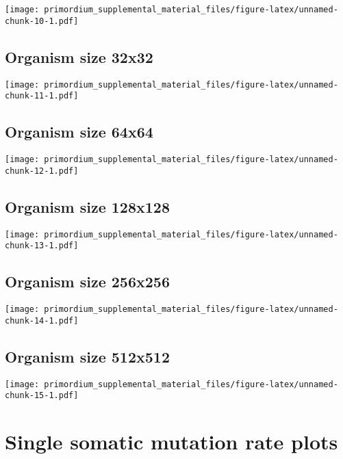 \documentclass[]{book}
\begin{document}
\texttt{[image: primordium\_supplemental\_material\_files/figure-latex/unnamed-chunk-10-1.pdf]}

\hypertarget{organism-size-32x32}{%
\subsection{Organism size 32x32}\label{organism-size-32x32}}

\texttt{[image: primordium\_supplemental\_material\_files/figure-latex/unnamed-chunk-11-1.pdf]}

\hypertarget{organism-size-64x64}{%
\subsection{Organism size 64x64}\label{organism-size-64x64}}

\texttt{[image: primordium\_supplemental\_material\_files/figure-latex/unnamed-chunk-12-1.pdf]}

\hypertarget{organism-size-128x128}{%
\subsection{Organism size 128x128}\label{organism-size-128x128}}

\texttt{[image: primordium\_supplemental\_material\_files/figure-latex/unnamed-chunk-13-1.pdf]}

\hypertarget{organism-size-256x256}{%
\subsection{Organism size 256x256}\label{organism-size-256x256}}

\texttt{[image: primordium\_supplemental\_material\_files/figure-latex/unnamed-chunk-14-1.pdf]}

\hypertarget{organism-size-512x512}{%
\subsection{Organism size 512x512}\label{organism-size-512x512}}

\texttt{[image: primordium\_supplemental\_material\_files/figure-latex/unnamed-chunk-15-1.pdf]}

\hypertarget{single-somatic-mutation-rate-plots}{%
\section{Single somatic mutation rate plots}\label{single-somatic-mutation-rate-plots}}
\end{document}
